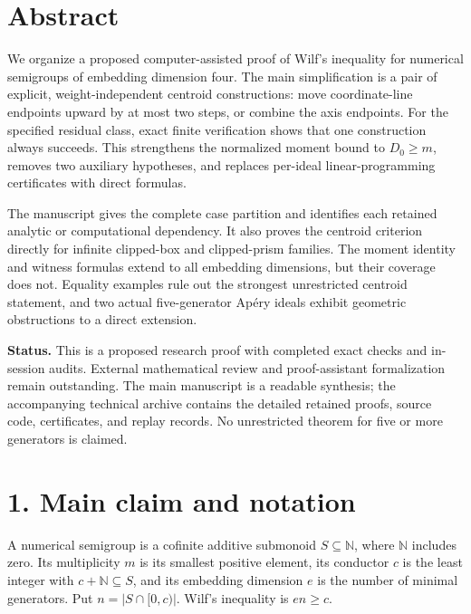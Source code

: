 \documentclass[
  11pt,
  a4paper,
]{article}
\author{}
\date{}
\let\oldsection\section
\renewcommand{\section}{\Needspace{7\baselineskip}\oldsection}
\begin{document}
{
\setcounter{tocdepth}{1}
\tableofcontents
}
\hypertarget{abstract}{%
\section{Abstract}\label{abstract}}

We organize a proposed computer-assisted proof of Wilf's inequality for
numerical semigroups of embedding dimension four. The main
simplification is a pair of explicit, weight-independent centroid
constructions: move coordinate-line endpoints upward by at most two
steps, or combine the axis endpoints. For the specified residual class,
exact finite verification shows that one construction always succeeds.
This strengthens the normalized moment bound to \(D_0\ge m\), removes
two auxiliary hypotheses, and replaces per-ideal linear-programming
certificates with direct formulas.

The manuscript gives the complete case partition and identifies each
retained analytic or computational dependency. It also proves the
centroid criterion directly for infinite clipped-box and clipped-prism
families. The moment identity and witness formulas extend to all
embedding dimensions, but their coverage does not. Equality examples
rule out the strongest unrestricted centroid statement, and two actual
five-generator Apéry ideals exhibit geometric obstructions to a direct
extension.

\textbf{Status.} This is a proposed research proof with completed exact
checks and in-session audits. External mathematical review and
proof-assistant formalization remain outstanding. The main manuscript is
a readable synthesis; the accompanying technical archive contains the
detailed retained proofs, source code, certificates, and replay records.
No unrestricted theorem for five or more generators is claimed.

\clearpage

\hypertarget{main-claim-and-notation}{%
\section{1. Main claim and notation}\label{main-claim-and-notation}}

A numerical semigroup is a cofinite additive submonoid
\(S\subseteq\mathbb N\), where \(\mathbb N\) includes zero. Its
multiplicity \(m\) is its smallest positive element, its conductor \(c\)
is the least integer with \(c+\mathbb N\subseteq S\), and its embedding
dimension \(e\) is the number of minimal generators. Put
\(n=|S\cap[0,c)|\). Wilf's inequality is \(en\ge c\).
\end{document}
